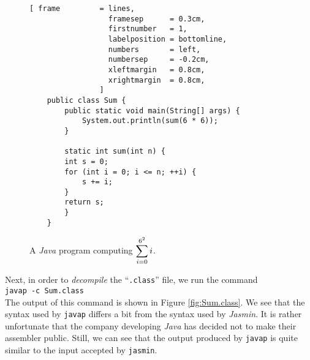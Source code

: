 \begin{figure}[!ht]
\centering
\begin{Verbatim}[ frame         = lines, 
                  framesep      = 0.3cm, 
                  firstnumber   = 1,
                  labelposition = bottomline,
                  numbers       = left,
                  numbersep     = -0.2cm,
                  xleftmargin   = 0.8cm,
                  xrightmargin  = 0.8cm,
                ]
    public class Sum {
        public static void main(String[] args) {
            System.out.println(sum(6 * 6));
        }
    
        static int sum(int n) {
    	int s = 0;
    	for (int i = 0; i <= n; ++i) {
    	    s += i;
    	}
    	return s;
        }
    }
\end{Verbatim}
\vspace*{-0.3cm}
\caption{A \textsl{Java} program computing $\displaystyle\sum\limits_{i=0}^{6^2} i$.}
\label{fig:Sum.java}
\end{figure}

Next, in order to \emph{decompile} the ``\texttt{.class}'' file, we run the command
\\[0.2cm]
\hspace*{1.3cm}
\texttt{javap -c Sum.class}
\\[0.2cm]
The output of this command is shown in Figure \ref{fig:Sum.class}.  We see that the syntax used by
\texttt{javap} differs a bit from the syntax used by \textsl{Jasmin}.  It is rather unfortunate that
the company developing \textsl{Java} has decided not to make their assembler public.  Still, we can
see that the output produced by \texttt{javap} is quite similar to the input accepted by \texttt{jasmin}.

